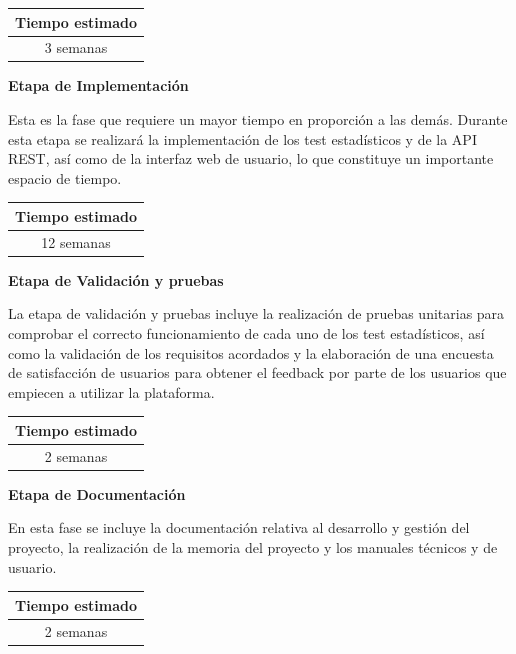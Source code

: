 \begin{table}[H]
	\centering
	\begin{tabular}{|c|}
		\hline
		\textbf{Tiempo estimado} \\ \hline
		3 semanas \\ \hline
	\end{tabular}
\end{table}

\noindent
\textbf{Etapa de Implementación}

Esta es la fase que requiere un mayor tiempo en proporción a las demás. Durante esta etapa se realizará la implementación de los test estadísticos y de la API REST, así como de la interfaz web de usuario, lo que constituye un importante espacio de tiempo.

\begin{table}[H]
	\centering
	\begin{tabular}{|c|}
		\hline
		\textbf{Tiempo estimado} \\ \hline
		12 semanas \\ \hline
	\end{tabular}
\end{table}

\noindent
\textbf{Etapa de Validación y pruebas}

La etapa de validación y pruebas incluye la realización de pruebas unitarias para comprobar el correcto funcionamiento de cada uno de los test estadísticos, así como la validación de los requisitos acordados y la elaboración de una encuesta de satisfacción de usuarios para obtener el feedback por parte de los usuarios que empiecen a utilizar la plataforma.

\begin{table}[H]
	\centering
	\begin{tabular}{|c|}
		\hline
		\textbf{Tiempo estimado} \\ \hline
		2 semanas \\ \hline
	\end{tabular}
\end{table}

\noindent
\textbf{Etapa de Documentación}

En esta fase se incluye la documentación relativa al desarrollo y gestión del proyecto, la realización de la memoria del proyecto y los manuales técnicos y de usuario.

\begin{table}[H]
	\centering
	\begin{tabular}{|c|}
		\hline
		\textbf{Tiempo estimado} \\ \hline
		2 semanas \\ \hline
	\end{tabular}
\end{table}

